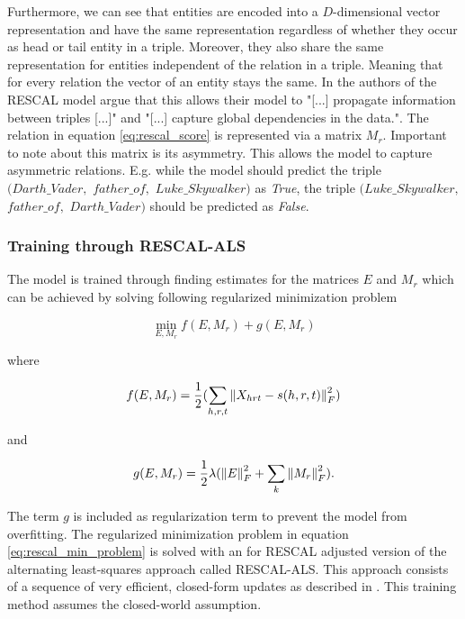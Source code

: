 Furthermore, we can see that entities are encoded into a $D$-dimensional vector representation and have the same representation regardless of whether they occur as head or tail entity in a triple. Moreover, they also share the same representation for entities independent of the relation in a triple. Meaning that for every relation the vector of an entity stays the same. In \cite{nickel_review_2015} the authors of the RESCAL model argue that this allows their model to "[...] propagate information between triples [...]" and "[...] capture global dependencies in the data.". The relation in equation \ref{eq:rescal_score} is represented via a matrix $M_r$. Important to note about this matrix is its asymmetry. This allows the model to capture asymmetric relations. E.g. while the model should predict the triple $(Darth\_Vader,$ $ father\_of,$ $ Luke\_Skywalker)$ as \textit{True}, the triple $(Luke\_Skywalker,$ $ father\_of,$ $ Darth\_Vader)$ should be predicted as \textit{False}. 

\subsubsection{Training through RESCAL-ALS}
The model is trained through finding estimates for the matrices $E$ and $M_r$ which can be achieved by solving following regularized minimization problem

\begin{equation}
\label{eq:rescal_min_problem}
\min_{E, M_r} f(E,M_r) + g(E, M_r)
\end{equation}

where 

\begin{equation}
\label{eq:rescal_als}
f(E,M_r)=\frac{1}{2}(\sum_{h,r,t} \left\lVert X_{hrt}-s(h,r,t)\right\rVert^2_F)
\end{equation}

and 

\begin{equation}
\label{eq:rescal_regu}
g(E, M_r)=\frac{1}{2}\lambda(\left\lVert E\right\rVert^2_F + \sum_k\left\lVert M_r\right\rVert^2_F).
\end{equation}

The term $g$ is included as regularization term to prevent the model from overfitting. The regularized minimization problem in equation \ref{eq:rescal_min_problem} is solved with an for RESCAL adjusted version of the alternating least-squares approach called RESCAL-ALS. This approach consists of a sequence of very efficient, closed-form updates as described in \cite{nickel_factorizing_2012}. This training method assumes the closed-world assumption.


